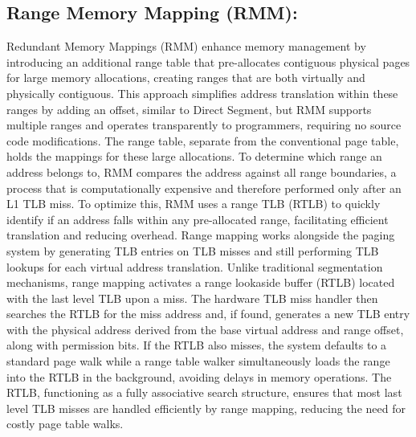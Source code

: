 \subsection{Range Memory Mapping (RMM):}
Redundant Memory Mappings (RMM)\cite{karakostas_redundant_2015} enhance memory management by introducing an additional range table 
that pre-allocates contiguous physical pages for large memory allocations, creating ranges that 
are both virtually and physically contiguous. This approach simplifies address translation 
within these ranges by adding an offset, similar to Direct Segment, but RMM supports multiple 
ranges and operates transparently to programmers, requiring no source code modifications. 
The range table, separate from the conventional page table, holds the mappings for these 
large allocations. To determine which range an address belongs to, RMM compares the address 
against all range boundaries, a process that is computationally expensive and therefore performed 
only after an L1 TLB miss. To optimize this, RMM uses a range TLB (RTLB) to quickly identify 
if an address falls within any pre-allocated range, facilitating efficient translation and 
reducing overhead. Range mapping works alongside the paging system by generating TLB entries on 
TLB misses and still performing TLB lookups for each virtual address translation. 
Unlike traditional segmentation mechanisms, range mapping activates a range lookaside 
buffer (RTLB) located with the last level TLB upon a miss. The hardware TLB miss 
handler then searches the RTLB for the miss address and, if found, generates a new 
TLB entry with the physical address derived from the base virtual address and 
range offset, along with permission bits. If the RTLB also misses, the system 
defaults to a standard page walk while a range table walker simultaneously 
loads the range into the RTLB in the background, avoiding delays in memory operations. 
The RTLB, functioning as a fully associative search structure, ensures 
that most last level TLB misses are handled efficiently by range mapping, 
reducing the need for costly page table walks.
\newline

